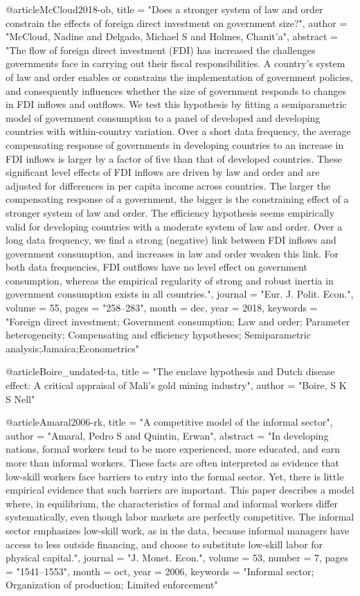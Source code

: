 {@article{McCloud2018-ob,
	title    = "Does a stronger system of law and order constrain the effects of
	foreign direct investment on government size?",
	author   = "McCloud, Nadine and Delgado, Michael S and Holmes, Chanit'a",
	abstract = "The flow of foreign direct investment (FDI) has increased the
	challenges governments face in carrying out their fiscal
	responsibilities. A country's system of law and order enables or
	constrains the implementation of government policies, and
	consequently influences whether the size of government responds
	to changes in FDI inflows and outflows. We test this hypothesis
	by fitting a semiparametric model of government consumption to a
	panel of developed and developing countries with within-country
	variation. Over a short data frequency, the average compensating
	response of governments in developing countries to an increase in
	FDI inflows is larger by a factor of five than that of developed
	countries. These significant level effects of FDI inflows are
	driven by law and order and are adjusted for differences in per
	capita income across countries. The larger the compensating
	response of a government, the bigger is the constraining effect
	of a stronger system of law and order. The efficiency hypothesis
	seems empirically valid for developing countries with a moderate
	system of law and order. Over a long data frequency, we find a
	strong (negative) link between FDI inflows and government
	consumption, and increases in law and order weaken this link. For
	both data frequencies, FDI outflows have no level effect on
	government consumption, whereas the empirical regularity of
	strong and robust inertia in government consumption exists in all
	countries.",
	journal  = "Eur. J. Polit. Econ.",
	volume   =  55,
	pages    = "258--283",
	month    =  dec,
	year     =  2018,
	keywords = "Foreign direct investment; Government consumption; Law and order;
	Parameter heterogeneity; Compensating and efficiency hypotheses;
	Semiparametric analysis;Jamaica;Econometrics"
}

@article{Boire_undated-ta,
	title  = "The enclave hypothesis and Dutch disease effect: A critical
	appraisal of Mali's gold mining industry",
	author = "Boire, S K S Nell"
}

@article{Amaral2006-rk,
	title    = "A competitive model of the informal sector",
	author   = "Amaral, Pedro S and Quintin, Erwan",
	abstract = "In developing nations, formal workers tend to be more
	experienced, more educated, and earn more than informal workers.
	These facts are often interpreted as evidence that low-skill
	workers face barriers to entry into the formal sector. Yet, there
	is little empirical evidence that such barriers are important.
	This paper describes a model where, in equilibrium, the
	characteristics of formal and informal workers differ
	systematically, even though labor markets are perfectly
	competitive. The informal sector emphasizes low-skill work, as in
	the data, because informal managers have access to less outside
	financing, and choose to substitute low-skill labor for physical
	capital.",
	journal  = "J. Monet. Econ.",
	volume   =  53,
	number   =  7,
	pages    = "1541--1553",
	month    =  oct,
	year     =  2006,
	keywords = "Informal sector; Organization of production; Limited enforcement"
}

}
